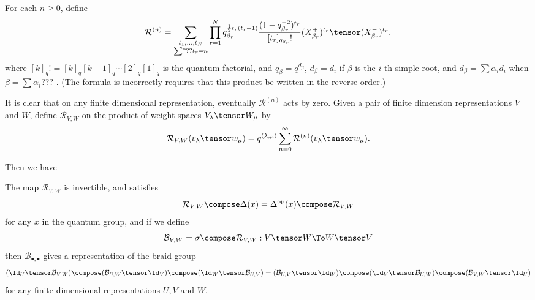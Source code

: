 For each $n\geq0$, define
\begin{equation}
\mathcal{R}^{(n)} = \sum_{\substack{t_1, \ldots, t_N \\ \sum ??? t_r = n}} \prod_{r=1}^N q_{\beta_r}^{\frac{1}{2}t_r(t_r+1)} \frac{(1-q_{\beta_r}^{-2})^{t_r}}{[t_r]_{q_{\beta_r}}!} (X_{\beta_r}^+)^{t_r} \tensor (X_{\beta_r}^-)^{t_r}.
\end{equation}
where $[k]_q! = [k]_q [k-1]_q \cdots [2]_q [1]_q$ is the quantum factorial, and $q_\beta = q^{d_\beta}$, $d_\beta = d_i$ if $\beta$ is the $i$-th simple root, and $d_\beta = \sum \alpha_i d_i$ when $\beta = \sum \alpha_i ???$ .
(The formula is \cite{CP} incorrectly requires that this product be written in the reverse order.)

It is clear that on any finite dimensional representation, eventually $\mathcal{R}^{(n)}$ acts by zero. Given a pair of finite dimension representations $V$ and $W$,
define $\mathcal{R}_{V,W}$ on the product of weight spaces $V_\lambda \tensor W_\mu$ by
\begin{equation}
\mathcal{R}_{V,W}(v_\lambda\tensor w_\mu) = q^{(\lambda,\mu)} \sum_{n=0}^\infty \mathcal{R}^{(n)}(v_\lambda \tensor w_\mu).
\end{equation}

Then we have \cite[Proposition 10.1.19]{CP}
\begin{prop}
The map $\mathcal{R}_{V,W}$ is invertible, and satisfies
\begin{equation*}
\mathcal{R}_{V,W} \compose \Delta(x) = \Delta^{\text{op}}(x) \compose \mathcal{R}_{V,W}
\end{equation*}
for any $x$ in the quantum group, and if we define $$\mathcal{B}_{V,W} = \sigma \compose \mathcal{R}_{V,W} : V \tensor W \To W \tensor V$$ then $\mathcal{B}_{\bullet,\bullet}$ gives a representation of the braid group
\begin{equation*}
(\Id_U \tensor \mathcal{B}_{V,W}) \compose (\mathcal{B}_{U,W}\tensor \Id_V) \compose (\Id_W\tensor\mathcal{B}_{U,V}) = (\mathcal{B}_{U,V}\tensor\Id_W) \compose (\Id_V\tensor\mathcal{B}_{U,W}) \compose (\mathcal{B}_{V,W}\tensor\Id_U)
\end{equation*}
for any finite dimensional representations $U, V$ and $W$.
\end{prop}


\subsection{}
